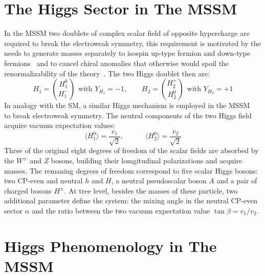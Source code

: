 \section{The Higgs Sector in The MSSM }
In the MSSM two doublets of complex scalar field of opposite hypercharge are required to break the electroweak symmetry, 
this requirement is motivated by the needs to generate  masses separately to isospin up-type fermion and down-type fermions~\cite{djouadiP21}
and to cancel chiral anomalies that otherwise would spoil the renormalizability of the theory~\cite{djouadiP21}. The two Higgs doublet then are:
\begin{equation}
H_1 = \binom{H_1^0}{H_1^-} ~ ~ \text{with } Y_{H_1} = -1, \quad \quad H_2 = \binom{H_2^+}{H_2^0} ~ ~ \text{with } Y_{H_2} = +1  
\end{equation}
In analogy with the SM, a similar Higgs mechanism is employed in the MSSM~\cite{djuadiP22} to break electroweak symmetry. The neutral components of the 
two Higgs field acquire vacuum expectation values:
\begin{equation}
\langle H_1^0 \rangle = \frac{v_1}{\sqrt{2}}, \quad \quad \quad  \langle H_2^0 \rangle = \frac{v_2}{\sqrt{2}}
\end{equation}
Three of the original eight degrees of freedom of the scalar fields are absorbed by the $W^{\pm}$ and $Z$ bosons, building their lomgitudinal
polarizations and acquire masses. The remaning degrees of freedom correspond to five scalar Higgs bosons: two CP-even and neutral $h$ and $H$, 
a neutral pseudoscalar boson $A$ and a pair of charged bosons $H^{\pm}$. At tree level, besides the masses of these particle, two additional parameter
define the system: the mixing angle in the neutral CP-even sector $\alpha$ and the ratio between the two vacuum expectation value $\tan \beta = v_1/v_2$.


\section{Higgs Phenomenology in The MSSM}


